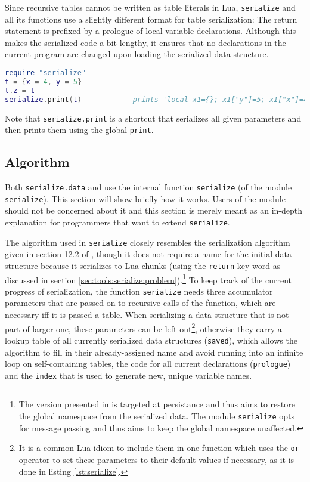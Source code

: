 Since recursive tables cannot be written as table literals in Lua, \texttt{serialize} and all its functions use a slightly different format for table serialization: The return statement is prefixed by a prologue of local variable declarations. Although this makes the serialized code a bit lengthy, it ensures that no declarations in the current program are changed upon loading the serialized data structure.

\begin{lstlisting}[language=lua, caption={Serializing a recursive table}, label=lst:serializeprint, name=lst:serializeprint]
require "serialize"
t = {x = 4, y = 5}
t.z = t
serialize.print(t)         -- prints 'local x1={}; x1["y"]=5; x1["x"]=4; x1["z"]=x1; return (x1)'
\end{lstlisting}

Note that \texttt{serialize.print} is a shortcut that serializes all given parameters and then prints them using the global \texttt{print}.

\subsection{Algorithm}
\label{sec:tools:algorithm}

Both \texttt{serialize.data} and  use the internal function \texttt{serialize} (of the module \texttt{serialize}). This section will show briefly how it works. Users of the module should not be concerned about it and this section is merely meant as an in-depth explanation for programmers that want to extend \texttt{serialize}.

The algorithm used in \texttt{serialize} closely resembles the serialization algorithm given in section 12.2 of \cite{Ierusalimschy2006}, though it does not require a name for the initial data structure because it serializes to Lua chunks (using the \texttt{return} key word as discussed in section \ref{sec:tools:serialize:problem}).\footnote{The version presented in \cite{Ierusalimschy2006} is targeted at persistance and thus aims to restore the global namespace from the serialized data. The module \texttt{serialize} opts for message passing and thus aims to keep the global namespace unaffected.} To keep track of the current progress of serialization, the function \texttt{serialize} needs three accumulator parameters that are passed on to recursive calls of the function, which are necessary iff it is passed a table. When serializing a data structure that is not part of larger one, these parameters can be left out\footnote{It is a common Lua idiom to include them in one function which uses the \texttt{or} operator to set these parameters to their default values if necessary, as it is done in listing \ref{lst:serialize}.}, otherwise they carry a lookup table of all currently serialized data structures (\texttt{saved}), which allows the algorithm to fill in their already-assigned name and avoid running into an infinite loop on self-containing tables, the code for all current declarations (\texttt{prologue}) and the \texttt{index} that is used to generate new, unique variable names.


